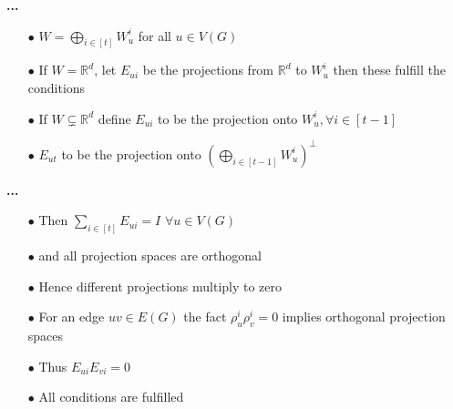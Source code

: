 \documentclass[13.5pt]{beamer}
\begin{document}
\begin{frame}
\begin{block}{\color{colororange}\textbf{...}}
\begin{itemize}
\item[$\bullet$] $W = \bigoplus_{i\in [t]} W_u^i$ for all $u\in V(G)$ \pause
\item[$\bullet$] If $W=\mathbb{R}^d$, let $E_{ui}$ be the projections from $\mathbb{R}^d$ to $W_u^i$ then these fulfill the conditions \pause
\item[$\bullet$] If $W \subsetneq \mathbb{R}^d$ define $E_{ui}$ to be the projection onto $W_u^i, \forall i\in[t-1]$ \pause
\item[$\bullet$] $E_{ut}$ to be the projection onto $(\bigoplus_{i\in[t-1]}W_u^i)^\perp$
\end{itemize}
\end{block}
\end{frame}

\begin{frame}
\begin{block}{\color{colororange}\textbf{...}}
\begin{itemize}
\item[$\bullet$] Then $\sum_{i\in [t]} E_{ui} = I$ $ \forall u\in V(G)$ \pause
\item[$\bullet$] and all projection spaces are orthogonal \pause
\item[$\bullet$] Hence different projections multiply to zero \pause
\item[$\bullet$] For an edge $uv \in E(G)$ the fact $\rho_u^i \rho_v^i=0$ implies orthogonal projection spaces \pause
\item[$\bullet$] Thus $E_{ui}E_{vi}=0$ \pause
\item[$\bullet$] All conditions are fulfilled 

\end{itemize}
\end{block}
\end{frame}
\end{document}
